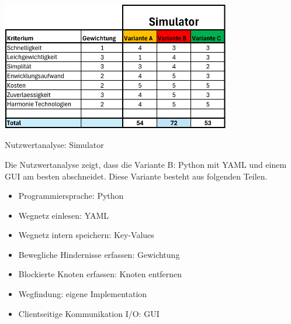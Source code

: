 \begin{table}[H]
\centering
\includegraphics[width=0.75\textwidth]{assets/Nutzwertanalyse-Simulator.pdf}
\caption{Nutzwertanalyse: Simulator}
\label{table:nutzwert-Simulator}
\end{table}

Die Nutzwertanalyse zeigt, dass die Variante B: Python mit YAML und einem GUI am besten abschneidet. Diese Variante besteht aus folgenden Teilen.

\begin{itemize}
    \item Programmiersprache: Python
    \item Wegnetz einlesen: YAML
    \item Wegnetz intern speichern: Key-Values
    \item Bewegliche Hindernisse erfassen: Gewichtung
    \item Blockierte Knoten erfassen: Knoten entfernen
    \item Wegfindung: eigene Implementation
    \item Clientseitige Kommunikation I/O: GUI
\end{itemize}